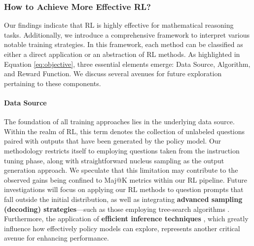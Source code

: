 \begin{itemize}[topsep=0pt]
\begin{itemize}[topsep=0pt]
\subsubsection{How to Achieve More Effective RL?}
\label{sec:effec_rl}
Our findings indicate that RL is highly effective for mathematical reasoning tasks. Additionally, we introduce a comprehensive framework to interpret various notable training strategies. In this framework, each method can be classified as either a direct application or an abstraction of RL methods. As highlighted in Equation \ref{eq:objective}, three essential elements emerge: Data Source, Algorithm, and Reward Function. We discuss several avenues for future exploration pertaining to these components.

\paragraph{Data Source} The foundation of all training approaches lies in the underlying data source. Within the realm of RL, this term denotes the collection of unlabeled questions paired with outputs that have been generated by the policy model. Our methodology restricts itself to employing questions taken from the instruction tuning phase, along with straightforward nucleus sampling as the output generation approach. We speculate that this limitation may contribute to the observed gains being confined to Maj@K metrics within our RL pipeline. Future investigations will focus on applying our RL methods to question prompts that fall outside the initial distribution, as well as integrating \textbf{advanced sampling (decoding) strategies}—such as those employing tree-search algorithms \citep{yao2023tree}. Furthermore, the application of \textbf{efficient inference techniques} \citep{xia-etal-2023-speculative,leviathan2023fast,kwon2023efficient,xia2024unlocking}, which greatly influence how effectively policy models can explore, represents another critical avenue for enhancing performance.


\end{itemize}
\end{itemize}

